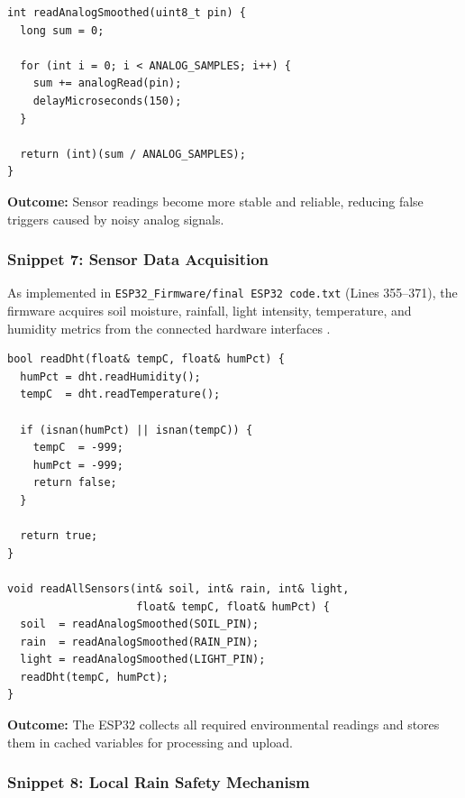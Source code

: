 \begin{lstlisting}
int readAnalogSmoothed(uint8_t pin) {
  long sum = 0;

  for (int i = 0; i < ANALOG_SAMPLES; i++) {
    sum += analogRead(pin);
    delayMicroseconds(150);
  }

  return (int)(sum / ANALOG_SAMPLES);
}
\end{lstlisting}

\textbf{Outcome:} Sensor readings become more stable and reliable, 
reducing false triggers caused by noisy analog signals.

\subsubsection{Snippet 7: Sensor Data Acquisition}
\label{subsec:snippet7}

As implemented in \texttt{ESP32\_Firmware/final ESP32 code.txt} (Lines 355--371), the firmware acquires soil moisture, rainfall, light intensity, 
temperature, and humidity metrics from the connected hardware interfaces 
\cite{mohanraj2016field}.

\begin{lstlisting}
bool readDht(float& tempC, float& humPct) {
  humPct = dht.readHumidity();
  tempC  = dht.readTemperature();

  if (isnan(humPct) || isnan(tempC)) {
    tempC  = -999;
    humPct = -999;
    return false;
  }

  return true;
}

void readAllSensors(int& soil, int& rain, int& light,
                    float& tempC, float& humPct) {
  soil  = readAnalogSmoothed(SOIL_PIN);
  rain  = readAnalogSmoothed(RAIN_PIN);
  light = readAnalogSmoothed(LIGHT_PIN);
  readDht(tempC, humPct);
}
\end{lstlisting}

\textbf{Outcome:} The ESP32 collects all required environmental 
readings and stores them in cached variables for processing and 
upload.

\subsubsection{Snippet 8: Local Rain Safety Mechanism}
\label{subsec:snippet8}

